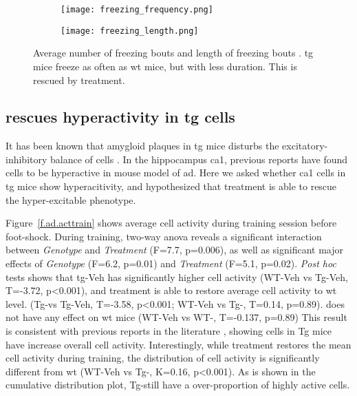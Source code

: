\begin{figure}[h]
    \begin{subfigure}[h]{\textwidth}
        \texttt{[image: freezing\_frequency.png]}
        \caption{\label{f.ad.freezing_freq}}
    \end{subfigure}
    \begin{subfigure}[h]{\textwidth}
        \texttt{[image: freezing\_length.png]}
        \caption{\label{f.ad.freezing_length}}
    \end{subfigure}
    \caption{Average number of freezing bouts  and length of freezing bouts . \Gls{tg} mice freeze as often as \gls{wt} mice, but with less duration. This is rescued by \tglu treatment. \label{f.ad.freezing_profile}}
\end{figure}


\subsection{\tglu rescues hyperactivity in \gls{tg} cells}

It has been known that amygloid plaques in \gls{tg} mice disturbs the excitatory-inhibitory balance of cells . In the hippocampus \gls{ca1}, previous reports have found cells to be hyperactive in mouse model of \gls{ad}. Here we asked whether \gls{ca1} cells in \gls{tg} mice show hyperacitivity, and hypothesized that \tglu treatment is able to rescue the hyper-excitable phenotype.

Figure~\ref{f.ad.acttrain} shows average cell activity during training session before foot-shock. During training, two-way \gls{anova} reveals a significant interaction between \textit{Genotype} and \textit{Treatment} (F=7.7, p=0.006), as well as significant major effects of \textit{Genotype} (F=6.2, p=0.01) and \textit{Treatment} (F=5.1, p=0.02). \textit{Post hoc} tests shows that \gls{tg}-Veh has significantly higher cell activity (WT-Veh vs Tg-Veh, T=-3.72, p<0.001), and \tglu treatment is able to restore average cell activity to \gls{wt} level. (Tg-\glu vs Tg-Veh, T=-3.58, p<0.001; WT-Veh vs Tg-\glu, T=0.14, p=0.89). \tglu does not have any effect on \gls{wt} mice (WT-Veh vs WT-\glu, T=-0.137, p=0.89) This result is consistent with previous reports in the literature \citep{verret12}, showing cells in Tg mice have increase overall cell activity. Interestingly, while \tglu treatment restores the mean cell activity during training, the distribution of cell activity is significantly different from \gls{wt} (WT-Veh vs Tg-\glu, K=0.16, p<0.001). As is shown in the cumulative distribution plot, Tg-\glu still have a over-proportion of highly active cells. 

